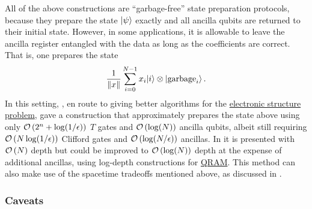 \begin{refsection}
All of the above constructions are ``garbage-free'' state preparation protocols, because they prepare the state $\lvert\psi\rangle$ exactly and all ancilla qubits are returned to their initial state. However, in some applications, it is allowable to leave the ancilla register entangled with the data as long as the coefficients are correct. That is, one prepares the state 
\begin{equation}
\frac{1}{\lVert x\rVert}\sum_{i=0}^{N-1} x_i \lvert i\rangle \otimes \lvert\mathrm{garbage}_i\rangle\,.
\end{equation}
In this setting, \cite[Sec. IIID]{babbush2018EncodingElectronicSpectraLinearT}, en route to giving better algorithms for the \hyperref[appl:ElectronicStructure]{electronic structure problem},  gave a construction that approximately prepares the state above using only $\mathcal{O}\left( 2^n+\log(1/\epsilon) \right)$ $T$ gates and $\mathcal{O}\left( \log(N) \right)$ ancilla qubits, albeit still requiring $\mathcal{O}\left( N\log(1/\epsilon) \right)$ Clifford gates and $\mathcal{O}\left( \log(N/\epsilon) \right)$ ancillas. In \cite{babbush2018EncodingElectronicSpectraLinearT} it is presented with $\mathcal{O}\left( N \right)$ depth but could be improved to $\mathcal{O}\left( \log(N) \right)$ depth at the expense of additional ancillas, using log-depth constructions for \hyperref[prim:QRAM]{QRAM}. This method can also make use of the spacetime tradeoffs mentioned above, as discussed in \cite{low2018tradingTgatesforDirtyQubits,Berry2019QubitizationOfArbitraryBasisChemistry}.

\subsubsection*{Caveats}


\end{refsection}
